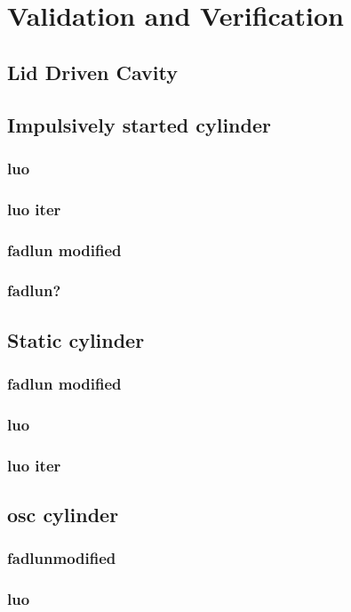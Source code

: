 \documentclass[onehalf,11pt]{beavtex}
\begin{document}
\chapter{Validation and Verification}\label{Validation}
\section{Lid Driven Cavity}
\section{Impulsively started cylinder}
\subsection{luo}
\subsection{luo iter}
\subsection{fadlun modified}
\subsection{fadlun?}
\section{Static cylinder}
\subsection{fadlun modified}
\subsection{luo}
\subsection{luo iter}
\section{osc cylinder}
\subsection{fadlunmodified}
\subsection{luo}
\end{document}

